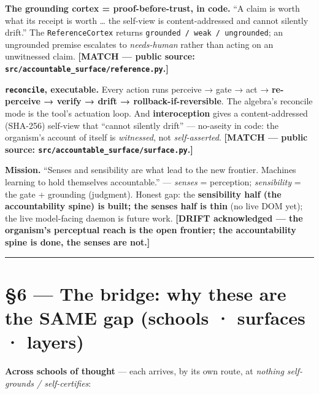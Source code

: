\documentclass[11pt]{article}
\begin{document}
\textbf{The grounding cortex = proof-before-trust, in code.} ``A claim is worth what its receipt is worth … the self-view is content-addressed and cannot silently drift.'' The \texttt{ReferenceCortex} returns \texttt{grounded / weak / ungrounded}; an ungrounded premise escalates to \emph{needs-human} rather than acting on an unwitnessed claim. \textbf{[MATCH — public source: \texttt{src/accountable\_surface/reference.py}.]}

\textbf{\texttt{reconcile}, executable.} Every action runs perceive → gate → act → \textbf{re-perceive → verify → drift → rollback-if-reversible}. The algebra's reconcile mode is the tool's actuation loop. And \textbf{interoception} gives a content-addressed (SHA-256) self-view that ``cannot silently drift'' — no-aseity in code: the organism's account of itself is \emph{witnessed}, not \emph{self-asserted}. \textbf{[MATCH — public source: \texttt{src/accountable\_surface/surface.py}.]}

\textbf{Mission.} ``Senses and sensibility are what lead to the new frontier. Machines learning to hold themselves accountable.'' — \emph{senses} = perception; \emph{sensibility} = the gate + grounding (judgment). Honest gap: the \textbf{sensibility half (the accountability spine) is built; the senses half is thin} (no live DOM yet); the live model-facing daemon is future work. \textbf{[DRIFT acknowledged — the organism's perceptual reach is the open frontier; the accountability spine is done, the senses are not.]}

\medskip\noindent\rule{\linewidth}{0.3pt}\medskip

\section*{§6 — The bridge: why these are the SAME gap (schools · surfaces · layers)}

\textbf{Across schools of thought} — each arrives, by its own route, at \emph{nothing self-grounds /\allowbreak{} self-certifies}:
\end{document}
